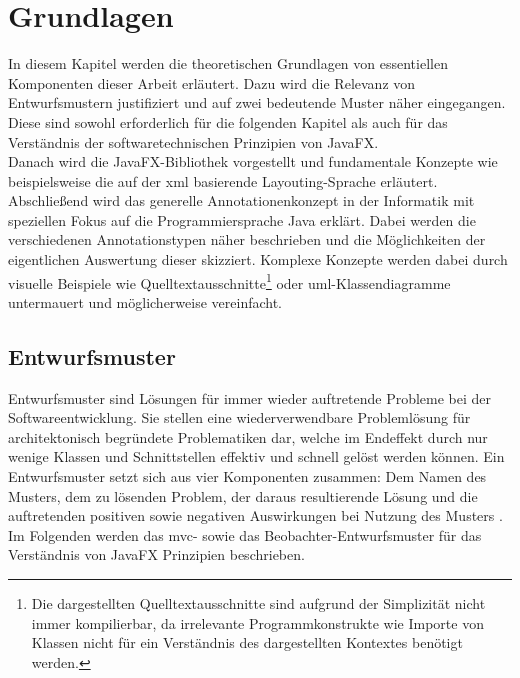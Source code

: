 \chapter{Grundlagen}
\label{grundlagen}
\noindent In diesem Kapitel werden die theoretischen Grundlagen von essentiellen Komponenten dieser Arbeit erläutert. Dazu wird die Relevanz von Entwurfsmustern justifiziert und auf zwei bedeutende Muster näher eingegangen. Diese sind sowohl erforderlich für die folgenden Kapitel als auch für das Verständnis der softwaretechnischen Prinzipien von JavaFX.\\
Danach wird die JavaFX-Bibliothek vorgestellt und fundamentale Konzepte wie beispielsweise die auf der \ac{xml} basierende Layouting-Sprache erläutert.\\
Abschließend wird das generelle Annotationenkonzept in der Informatik mit speziellen Fokus auf die Programmiersprache Java erklärt. Dabei werden die verschiedenen Annotationstypen näher beschrieben und die Möglichkeiten der eigentlichen Auswertung dieser skizziert. Komplexe Konzepte werden dabei durch visuelle Beispiele wie Quelltextausschnitte\footnote{Die dargestellten Quelltextausschnitte sind aufgrund der Simplizität nicht immer kompilierbar, da irrelevante Programmkonstrukte wie Importe von Klassen nicht für ein Verständnis des dargestellten Kontextes benötigt werden.} oder \ac{uml}-Klassendiagramme untermauert und möglicherweise vereinfacht.

\section{Entwurfsmuster}
\label{entwurfsmuster}
Entwurfsmuster sind Lösungen für immer wieder auftretende Probleme bei der Softwareentwicklung. Sie stellen eine wiederverwendbare Problemlösung für architektonisch begründete Problematiken dar, welche im Endeffekt durch nur wenige Klassen und Schnittstellen effektiv und schnell gelöst werden können. Ein Entwurfsmuster setzt sich aus vier Komponenten zusammen: Dem Namen des Musters, dem zu lösenden Problem, der daraus resultierende Lösung und die auftretenden positiven sowie negativen Auswirkungen bei Nutzung des Musters \cite{Gamma1993}.\\
Im Folgenden werden das \ac{mvc}- sowie das Beobachter-Entwurfsmuster für das Verständnis von JavaFX Prinzipien beschrieben.

